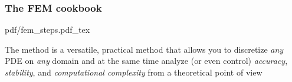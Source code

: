 \begin{frame}
  \frametitle{The FEM cookbook}

  \def\svgwidth{1.05\textwidth}
  {pdf/fem_steps.pdf_tex}

  The method is a versatile, practical method that allows you
  to discretize \emph{any} PDE on \emph{any} domain
  and  at the same time analyze (or even control) \emph{accuracy}, \emph{stability}, and \emph{computational complexity}
  from a theoretical point of view

\end{frame}

